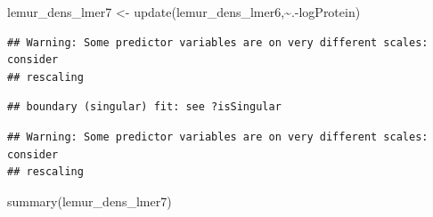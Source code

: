\documentclass[
  12pt,
]{article}
\newenvironment{Shaded}{\begin{snugshade}}{\end{snugshade}}
\newcommand{\FunctionTok}[1]{\textcolor[rgb]{0.00,0.00,0.00}{#1}}
\newcommand{\NormalTok}[1]{#1}
\newcommand{\OtherTok}[1]{\textcolor[rgb]{0.56,0.35,0.01}{#1}}
\newcommand{\SpecialCharTok}[1]{\textcolor[rgb]{0.00,0.00,0.00}{#1}}
\begin{document}
\begin{Shaded}
\begin{Highlighting}[]
\NormalTok{lemur\_dens\_lmer7 }\OtherTok{\textless{}{-}} \FunctionTok{update}\NormalTok{(lemur\_dens\_lmer6,}\SpecialCharTok{\textasciitilde{}}\NormalTok{.}\SpecialCharTok{{-}}\NormalTok{logProtein)}
\end{Highlighting}
\end{Shaded}

\begin{verbatim}
## Warning: Some predictor variables are on very different scales: consider
## rescaling
\end{verbatim}

\begin{verbatim}
## boundary (singular) fit: see ?isSingular
\end{verbatim}

\begin{verbatim}
## Warning: Some predictor variables are on very different scales: consider
## rescaling
\end{verbatim}

\begin{Shaded}
\begin{Highlighting}[]
\FunctionTok{summary}\NormalTok{(lemur\_dens\_lmer7)}
\end{Highlighting}
\end{Shaded}
\end{document}
